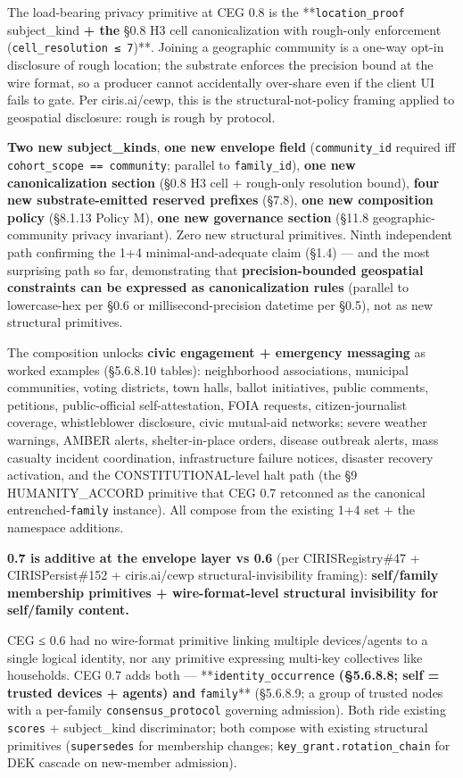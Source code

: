 \documentclass[10pt]{article}
\begin{document}
The load-bearing privacy primitive at CEG 0.8 is the **\texttt{location\_proof} subject\_kind\textbf{ + the }§0.8 H3 cell canonicalization with rough-only enforcement (\texttt{cell\_resolution ≤ 7})**. Joining a geographic community is a one-way opt-in disclosure of rough location; the substrate enforces the precision bound at the wire format, so a producer cannot accidentally over-share even if the client UI fails to gate. Per ciris.ai/cewp, this is the structural-not-policy framing applied to geospatial disclosure: rough is rough by protocol.


\textbf{Two new subject\_kinds}, \textbf{one new envelope field} (\texttt{community\_id} required iff \texttt{cohort\_scope == community}; parallel to \texttt{family\_id}), \textbf{one new canonicalization section} (§0.8 H3 cell + rough-only resolution bound), \textbf{four new substrate-emitted reserved prefixes} (§7.8), \textbf{one new composition policy} (§8.1.13 Policy M), \textbf{one new governance section} (§11.8 geographic-community privacy invariant). Zero new structural primitives. Ninth independent path confirming the 1+4 minimal-and-adequate claim (§1.4) — and the most surprising path so far, demonstrating that \textbf{precision-bounded geospatial constraints can be expressed as canonicalization rules} (parallel to lowercase-hex per §0.6 or millisecond-precision datetime per §0.5), not as new structural primitives.


The composition unlocks \textbf{civic engagement + emergency messaging} as worked examples (§5.6.8.10 tables): neighborhood associations, municipal communities, voting districts, town halls, ballot initiatives, public comments, petitions, public-official self-attestation, FOIA requests, citizen-journalist coverage, whistleblower disclosure, civic mutual-aid networks; severe weather warnings, AMBER alerts, shelter-in-place orders, disease outbreak alerts, mass casualty incident coordination, infrastructure failure notices, disaster recovery activation, and the CONSTITUTIONAL-level halt path (the §9 HUMANITY\_ACCORD primitive that CEG 0.7 retconned as the canonical entrenched-\texttt{family} instance). All compose from the existing 1+4 set + the namespace additions.


\textbf{0.7 is additive at the envelope layer vs 0.6} (per CIRISRegistry\#47 + CIRISPersist\#152 + ciris.ai/cewp structural-invisibility framing): \textbf{self/family membership primitives + wire-format-level structural invisibility for self/family content.}


CEG ≤ 0.6 had no wire-format primitive linking multiple devices/agents to a single logical identity, nor any primitive expressing multi-key collectives like households. CEG 0.7 adds both — **\texttt{identity\_occurrence}\textbf{ (§5.6.8.8; self = trusted devices + agents) and }\texttt{family}** (§5.6.8.9; a group of trusted nodes with a per-family \texttt{consensus\_protocol} governing admission). Both ride existing \texttt{scores} + subject\_kind discriminator; both compose with existing structural primitives (\texttt{supersedes} for membership changes; \texttt{key\_grant.rotation\_chain} for DEK cascade on new-member admission).
\end{document}
